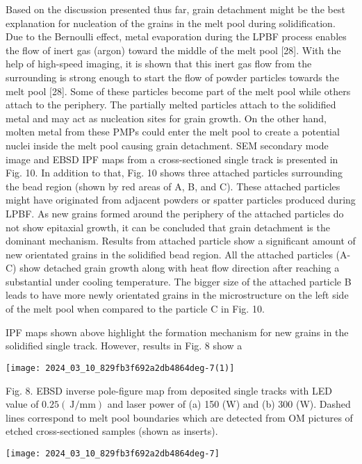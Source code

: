 \documentclass[10pt]{article}
\begin{document}
Based on the discussion presented thus far, grain detachment might be the best explanation for nucleation of the grains in the melt pool during solidification. Due to the Bernoulli effect, metal evaporation during the LPBF process enables the flow of inert gas (argon) toward the middle of the melt pool [28]. With the help of high-speed imaging, it is shown that this inert gas flow from the surrounding is strong enough to start the flow of powder particles towards the melt pool [28]. Some of these particles become part of the melt pool while others attach to the periphery. The partially melted particles attach to the solidified metal and may act as nucleation sites for grain growth. On the other hand, molten metal from these PMPs could enter the melt pool to create a potential nuclei inside the melt pool causing grain detachment. SEM secondary mode image and EBSD IPF maps from a cross-sectioned single track is presented in Fig. 10. In addition to that, Fig. 10 shows three attached particles surrounding the bead region (shown by red areas of A, B, and C). These attached particles might have originated from adjacent powders or spatter particles produced during LPBF. As new grains formed around the periphery of the attached particles do not show epitaxial growth, it can be concluded that grain detachment is the dominant mechanism. Results from attached particle show a significant amount of new orientated grains in the solidified bead region. All the attached particles (A-C) show detached grain growth along with heat flow direction after reaching a substantial under cooling temperature. The bigger size of the attached particle B leads to have more newly orientated grains in the microstructure on the left side of the melt pool when compared to the particle C in Fig. 10.

IPF maps shown above highlight the formation mechanism for new grains in the solidified single track. However, results in Fig. 8 show a

\begin{center}
\texttt{[image: 2024\_03\_10\_829fb3f692a2db4864deg-7(1)]}
\end{center}

Fig. 8. EBSD inverse pole-figure map from deposited single tracks with LED value of $0.25(\mathrm{~J} / \mathrm{mm})$ and laser power of (a) 150 (W) and (b) 300 (W). Dashed lines correspond to melt pool boundaries which are detected from OM pictures of etched cross-sectioned samples (shown as inserts).

\begin{center}
\texttt{[image: 2024\_03\_10\_829fb3f692a2db4864deg-7]}
\end{center}
\end{document}
